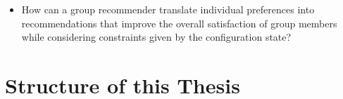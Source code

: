 \begin{itemize}
    \item How can a group recommender translate individual preferences into recommendations that improve the overall satisfaction of group members while considering constraints given by the configuration state? 
\end{itemize}


\section{Structure of this Thesis}
\label{sec:Introduction:Structure}

